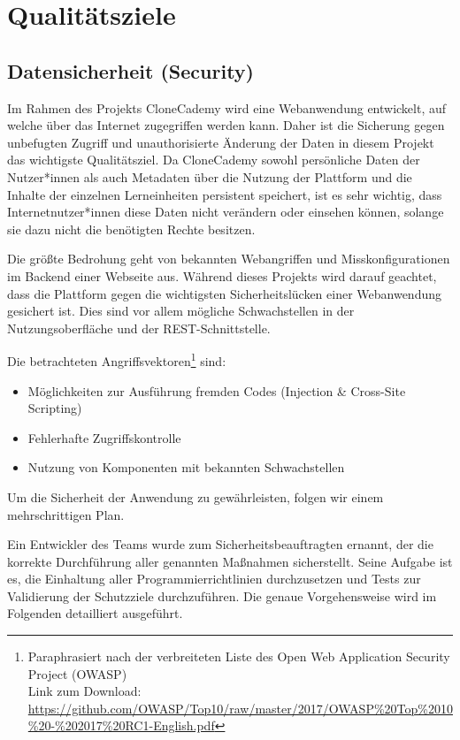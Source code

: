 \documentclass[accentcolor=tud0b,12pt,paper=a4]{tudreport}
\begin{document}
\chapter{Qualitätsziele}
\section{Datensicherheit (Security)}

Im Rahmen des Projekts CloneCademy wird eine Webanwendung entwickelt, auf welche über das Internet zugegriffen werden kann. Daher ist die Sicherung gegen unbefugten Zugriff und unauthorisierte Änderung der Daten in diesem Projekt das wichtigste Qualitätsziel. Da CloneCademy sowohl persönliche Daten der Nutzer*innen als auch Metadaten über die Nutzung der Plattform und die Inhalte der einzelnen Lerneinheiten persistent speichert, ist es sehr wichtig, dass Internetnutzer*innen diese Daten nicht verändern oder einsehen können, solange sie dazu nicht die benötigten Rechte besitzen.

Die größte Bedrohung geht von bekannten Webangriffen und Misskonfigurationen im Backend einer Webseite aus. Während dieses Projekts wird darauf geachtet, dass die Plattform gegen die wichtigsten Sicherheitslücken einer Webanwendung gesichert ist. Dies sind vor allem mögliche Schwachstellen in der Nutzungsoberfläche und der REST-Schnittstelle.

Die betrachteten Angriffsvektoren\footnote{Paraphrasiert nach der verbreiteten Liste des Open Web Application Security Project (OWASP)\\Link zum Download:  \href{https://github.com/OWASP/Top10/raw/master/2017/OWASP\%20Top\%2010\%20-\%202017\%20RC1-English.pdf}{https://github.com/OWASP/Top10/raw/master/2017/OWASP\%20Top\%2010\%20-\%202017\%20RC1-English.pdf}} sind:
\begin{itemize}
\item Möglichkeiten zur Ausführung fremden Codes (Injection \& Cross-Site Scripting)
\item Fehlerhafte Zugriffskontrolle
\item Nutzung von Komponenten mit bekannten Schwachstellen
\end{itemize}

Um die Sicherheit der Anwendung zu gewährleisten, folgen wir einem mehrschrittigen Plan.

Ein Entwickler des Teams wurde zum Sicherheitsbeauftragten ernannt, der die korrekte Durchführung aller genannten Maßnahmen sicherstellt. Seine Aufgabe ist es, die Einhaltung aller Programmierrichtlinien durchzusetzen und Tests zur Validierung der Schutzziele durchzuführen. Die genaue Vorgehensweise wird im Folgenden detailliert ausgeführt.
\end{document}
